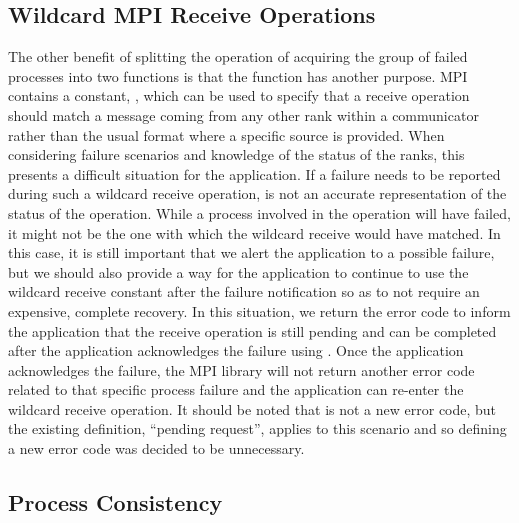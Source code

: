 \subsection{Wildcard MPI Receive Operations}\label{subsec:ulfm:wildcard}

The other benefit of splitting the operation of acquiring the group of failed
processes into two functions is that the 
function has another purpose. MPI contains a constant,
, which can be used to specify that a receive
operation should match a message coming from any other rank within a
communicator rather than the usual format where a specific source is provided. 
When considering failure scenarios and knowledge of the status of
the ranks, this presents a difficult situation for the application. If a failure
needs to be reported during such a wildcard receive operation,
 is not an accurate representation of the status
of the operation. While a process involved in the operation will have failed, it
might not be the one with which the wildcard receive would have matched. In this
case, it is still important that we alert the application to a possible failure,
but we should also provide a way for the application to continue to use the
wildcard receive constant after the failure notification so as to not require an
expensive, complete recovery. In this situation, we return the error code
 to inform the application that the receive operation
is still pending and can be completed after the application acknowledges the
failure using . Once the application
acknowledges the failure, the MPI library will not return another error code
related to that specific process failure and the application can re-enter the
wildcard receive operation. It should be noted that 
is not a new error code, but the existing definition, ``pending request'', 
applies to this scenario and so defining a new error code was decided to be 
unnecessary.

\subsection{Process Consistency}\label{subsec:ulfm:consistency}

